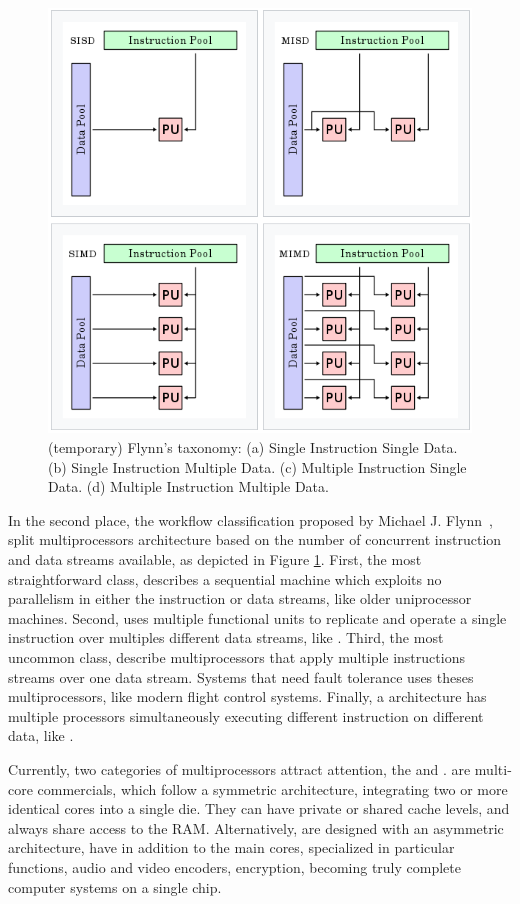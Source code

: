 			\begin{figure}[h]
				\centering
				\includegraphics[width=.6\textwidth]{images/flynn.png}

				\caption{
					(temporary) Flynn's taxonomy:
					(a) Single Instruction Single Data.
					(b) Single Instruction Multiple Data.
					(c) Multiple Instruction Single Data.
					(d) Multiple Instruction Multiple Data.
				}\par
				\label{fig.flynn}
			\end{figure}

			In the second place, the workflow classification proposed by Michael J. Flynn~\cite{Flynn},
			split multiprocessors architecture based on the number of concurrent
			instruction and data streams available, as depicted in Figure \ref{fig.flynn}.
			First, the most straightforward class, \sisd describes a sequential
			machine which exploits no parallelism in either the instruction or
			data streams, like older uniprocessor machines.
			Second, \simd uses multiple functional units to replicate and operate
			a single instruction over multiples different data streams, like \gpu.
			Third, the most uncommon class, \misd describe multiprocessors that
			apply multiple instructions streams over one data stream.
			Systems that need fault tolerance uses theses multiprocessors, like
			modern flight control systems.
			Finally, a \mimd architecture has multiple processors simultaneously
			executing different instruction on different data, like \xeonphi.

			Currently, two categories of multiprocessors attract attention, the \cmp and \soc.
			\cmps are multi-core commercials, which follow a symmetric architecture,
			integrating two or more identical cores into a single die.
			They can have private or shared cache levels, and always share access
			to the RAM.
			Alternatively, \socs are designed with an asymmetric architecture,
			have in addition to the main cores, specialized \cpus in particular
			functions, \eg audio and video encoders, encryption, becoming truly
			complete computer systems on a single chip.

